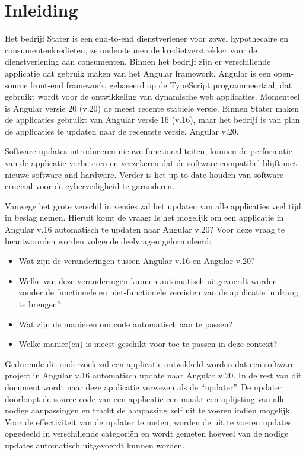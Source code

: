 
\section{Inleiding}
\label{sec:inleiding}

Het bedrijf Stater is een end-to-end dienstverlener voor zowel hypothecaire en consumentenkredieten, ze ondersteunen de kredietverstrekker voor de dienstverlening aan consumenten.
Binnen het bedrijf zijn er verschillende applicatie dat gebruik maken van het Angular framework.
Angular is een open-source front-end framework, gebaseerd op de TypeScript programmeertaal, dat gebruikt wordt voor de ontwikkeling van dynamische web applicaties.
Momenteel is Angular versie 20 (v.20) de meest recente stabiele versie.
Binnen Stater maken de applicaties gebruikt van Angular versie 16 (v.16), maar het bedrijf is van plan de applicaties te updaten naar de recentste versie, Angular v.20.

Software updates introduceren nieuwe functionaliteiten, kunnen de performatie van de applicatie verbeteren en verzekeren dat de software compatibel blijft met nieuwe software and hardware.
Verder is het up-to-date houden van software cruciaal voor de cyberveiligheid te garanderen.

Vanwege het grote verschil in versies zal het updaten van alle applicaties veel tijd in beslag nemen.
Hieruit komt de vraag: Is het mogelijk om een applicatie in Angular v.16 automatisch te updaten naar Angular v.20?
Voor deze vraag te beantwoorden worden volgende deelvragen geformuleerd:
\begin{itemize}
  \item Wat zijn de veranderingen tussen Angular v.16 en Angular v.20?
  \item Welke van deze veranderingen kunnen automatisch uitgevoerdt worden zonder de functionele en niet-functionele vereisten van de applicatie in drang te brengen?
  \item Wat zijn de manieren om code automatisch aan te passen?
  \item Welke manier(en) is meest geschikt voor toe te passen in deze context?
\end{itemize}

Gedurende dit onderzoek zal een applicatie ontwikkeld worden dat een software project in Angular v.16 automatisch update naar Angular v.20.
In de rest van dit document wordt naar deze applicatie verwezen als de ``updater''.
De updater doorloopt de source code van een applicatie een maakt een oplijsting van alle nodige aanpassingen en tracht de aanpassing zelf uit te voeren indien mogelijk.
Voor de effectiviteit van de updater te meten, worden de uit te voeren updates opgedeeld in verschillende categoriën en wordt gemeten hoeveel van de nodige updates automatisch uitgevoerdt kunnen worden.

